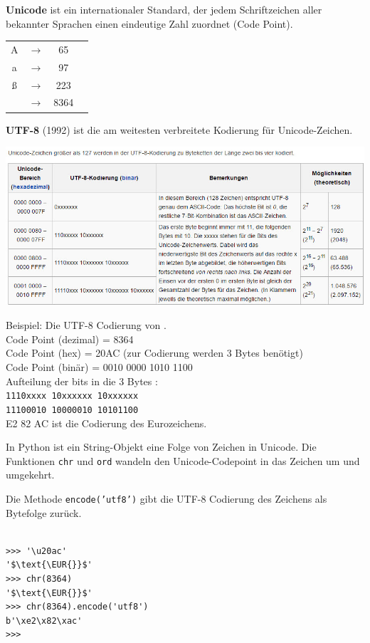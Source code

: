 \documentclass[10pt]{beamer}
\begin{document}
\begin{frame}[fragile]
\textbf{Unicode} ist ein internationaler Standard, der jedem Schriftzeichen aller bekannter Sprachen einen eindeutige Zahl zuordnet (Code Point).

\begin{tabular}{c c c c}
A & $\rightarrow$ & 65 \\
a &  $\rightarrow$ & 97 \\
ß &  $\rightarrow$ & 223 \\
\EUR{} & $\rightarrow$ & 8364 \\
\end{tabular}

\textbf{UTF-8} (1992) ist die am weitesten verbreitete Kodierung für Unicode-Zeichen.
\end{frame}

\begin{frame}[fragile]
\includegraphics[scale=0.65]{bild3.jpg}

\end{frame}

\begin{frame}[fragile]
Beispiel: Die UTF-8 Codierung von \EUR{}. \\ 
Code Point (dezimal) = 8364 \\  
Code Point (hex) =  20AC  (zur Codierung werden 3 Bytes benötigt) \\  
Code Point (binär) =  0010 0000 1010 1100 \\  
Aufteilung der bits in die 3 Bytes  : \\ 
\texttt{1110xxxx 10xxxxxx 10xxxxxx} \\ 
\texttt{11100010 10000010 10101100} \\ 
E2 82 AC   ist die Codierung des Eurozeichens.
\end{frame}

\begin{frame}[fragile]
In Python ist ein String-Objekt eine Folge von Zeichen in Unicode. Die Funktionen \texttt{chr} und \texttt{ord}
wandeln den Unicode-Codepoint in das Zeichen um und umgekehrt. 

Die Methode \texttt{encode('utf8')} gibt die UTF-8 Codierung des Zeichens als Bytefolge zurück. 

\begin{lstlisting}  

>>> '\u20ac'
'$\text{\EUR{}}$'
>>> chr(8364)
'$\text{\EUR{}}$'
>>> chr(8364).encode('utf8')
b'\xe2\x82\xac'
>>> 
\end{lstlisting} 
\end{frame}
\end{document}
